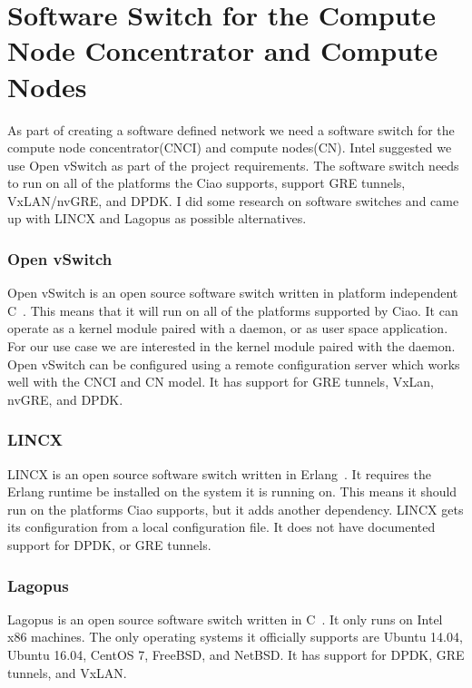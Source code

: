 \documentclass[10pt,letterpaper,onecolumn,draftclsnofoot]{IEEEtran}
\begin{document}

\section{Software Switch for the Compute Node Concentrator and Compute Nodes}
As part of creating a software defined network we need a software switch for the compute node concentrator(CNCI) and compute nodes(CN). 
Intel suggested we use Open vSwitch as part of the project requirements. 
The software switch needs to run on all of the platforms the Ciao supports, support GRE tunnels, VxLAN/nvGRE, and DPDK.
I did some research on software switches and came up with LINCX and Lagopus as possible alternatives.

\subsubsection{Open vSwitch}
Open vSwitch is an open source software switch written in platform independent C~\cite{ovs-readme}.
This means that it will run on all of the platforms supported by Ciao.
It can operate as a kernel module paired with a daemon, or as user space application.
For our use case we are interested in the kernel module paired with the daemon.
Open vSwitch can be configured using a remote configuration server which works well with the CNCI and CN model.
It has support for GRE tunnels, VxLan, nvGRE, and DPDK.

\subsubsection{LINCX}
LINCX is an open source software switch written in Erlang~\cite{lincx}.
It requires the Erlang runtime be installed on the system it is running on.
This means it should run on the platforms Ciao supports, but it adds another dependency.
LINCX gets its configuration from a local configuration file.
It does not have documented support for DPDK, or GRE tunnels.

\subsubsection{Lagopus}
Lagopus is an open source software switch written in C~\cite{lagopus}.
It only runs on Intel x86 machines.
The only operating systems it officially supports are Ubuntu 14.04, Ubuntu 16.04, CentOS 7, FreeBSD, and NetBSD.
It has support for DPDK, GRE tunnels, and VxLAN.
\end{document}
